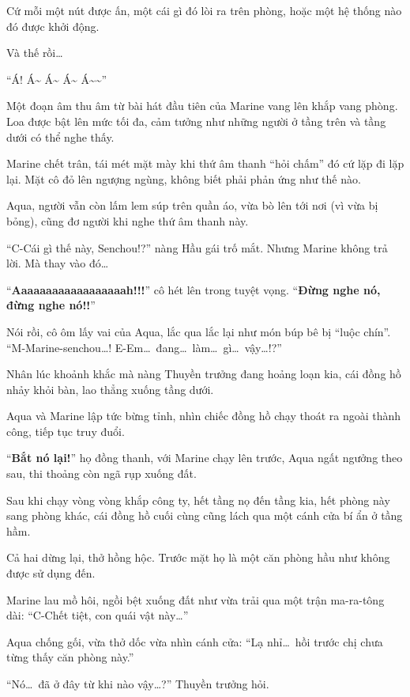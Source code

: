\documentclass[../main.tex]{subfiles}
\begin{document}
Cứ mỗi một nút được ấn, một cái gì đó lòi ra trên phòng, hoặc một hệ thống nào đó được khởi động.

Và thế rồi\dots

``Á! Á\~{} Á\~{} Á\~{} Á\~{}\~{}''

Một đoạn âm thu âm từ bài hát đầu tiên của Marine vang lên khắp vang phòng. Loa được bật lên mức tối đa, cảm tưởng như những người ở tầng trên và tầng dưới có thể nghe thấy.

Marine chết trân, tái mét mặt mày khi thứ âm thanh ``hỏi chấm'' đó cứ lặp đi lặp lại. Mặt cô đỏ lên ngượng ngùng, không biết phải phản ứng như thế nào.

Aqua, người vẫn còn lấm lem súp trên quần áo, vừa bò lên tới nơi (vì vừa bị bỏng), cũng đơ người khi nghe thứ âm thanh này.

``C-Cái gì thế này, Senchou!?'' nàng Hầu gái trố mắt. Nhưng Marine không trả lời. Mà thay vào đó\dots

``\textbf{Aaaaaaaaaaaaaaaaaah!!!}'' cô hét lên trong tuyệt vọng. ``\textbf{Đừng nghe nó, đừng nghe nó!!}''

Nói rồi, cô ôm lấy vai của Aqua, lắc qua lắc lại như món búp bê bị ``luộc chín''. ``M-Marine-senchou\dots! E-Em\dots\ đang\dots\ làm\dots\ gì\dots\ vậy\dots!?''

Nhân lúc khoảnh khắc mà nàng Thuyền trưởng đang hoảng loạn kia, cái đồng hồ nhảy khỏi bàn, lao thẳng xuống tầng dưới.

Aqua và Marine lập tức bừng tỉnh, nhìn chiếc đồng hồ chạy thoát ra ngoài thành công, tiếp tục truy đuổi.

``\textbf{Bắt nó lại!}'' họ đồng thanh, với Marine chạy lên trước, Aqua ngất ngưởng theo sau, thi thoảng còn ngã rụp xuống đất.

\ct

Sau khi chạy vòng vòng khắp công ty, hết tầng nọ đến tầng kia, hết phòng này sang phòng khác, cái đồng hồ cuối cùng cũng lách qua một cánh cửa bí ẩn ở tầng hầm.

Cả hai dừng lại, thở hồng hộc. Trước mặt họ là một căn phòng hầu như không được sử dụng đến.

Marine lau mồ hôi, ngồi bệt xuống đất như vừa trải qua một trận ma-ra-tông dài: ``C-Chết tiệt, con quái vật này\dots''

Aqua chống gối, vừa thở dốc vừa nhìn cánh cửa: ``Lạ nhỉ\dots\ hồi trước chị chưa từng thấy căn phòng này.''

``Nó\dots\ đã ở đây từ khi nào vậy\dots?'' Thuyền trưởng hỏi.
\end{document}
